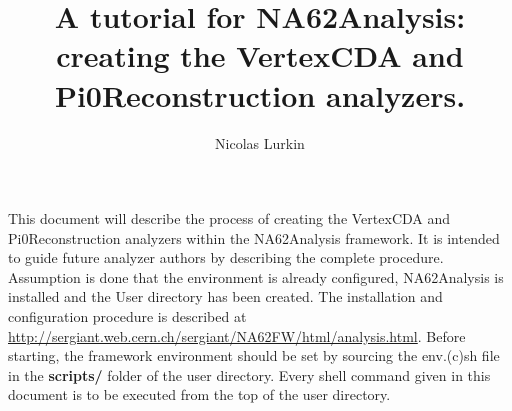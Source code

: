 \documentclass{article}
\title{A tutorial for NA62Analysis: creating the VertexCDA and
Pi0Reconstruction analyzers.}
\author{Nicolas Lurkin}
\renewcommand{\path}[1]{\textbf{#1}}
\begin{document}
\maketitle
\footnotesize
This document will describe the process of creating the VertexCDA and
Pi0Reconstruction analyzers within the NA62Analysis framework. It is intended to
guide future analyzer authors by describing the complete procedure. Assumption
is done that the environment is already configured, NA62Analysis is installed
and the User directory has been created. The installation and configuration
procedure is described at
\url{http://sergiant.web.cern.ch/sergiant/NA62FW/html/analysis.html}.
Before starting, the framework environment should be set by sourcing the
env.(c)sh file in the \path{scripts/} folder of the user directory. Every shell command
given in this document is to be executed from the top of the user directory.

%


\end{document}
